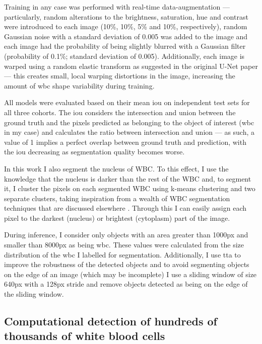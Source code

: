 Training in any case was performed with real-time data-augmentation --- particularly, random alterations to the brightness, saturation, hue and contrast were introduced to each image (10\%, 10\%, 5\% and 10\%, respectively), random Gaussian noise with a standard deviation of 0.005 was added to the image and each image had the probability of being slightly blurred with a Gaussian filter (probability of 0.1\%; standard deviation of 0.005). Additionally, each image is warped using a random elastic transform as suggested in the original U-Net paper \cite{Ronneberger2015-do} --- this creates small, local warping distortions in the image, increasing the amount of \ac{wbc} shape variability during training. 

All models were evaluated based on their mean \ac{iou} on independent test sets for all three cohorts. The \ac{iou} considers the intersection and union between the ground truth and the pixels predicted as belonging to the object of interest (\ac{wbc} in my case) and calculates the ratio between intersection and union --- as such, a value of 1 implies a perfect overlap between ground truth and prediction, with the \ac{iou} decreasing as segmentation quality becomes worse.

In this work I also segment the nucleus of WBC. To this effect, I use the knowledge that the nucleus is darker than the rest of the WBC and, to segment it, I cluster the pixels on each segmented WBC using k-means clustering and two separate clusters, taking inspiration from a wealth of WBC segmentation techniques that are discussed elsewhere \cite{Andrade2019-qv}. Through this I can easily assign each pixel to the darkest (nucleus) or brightest (cytoplasm) part of the image.

During inference, I consider only objects with an area greater than 1000px and smaller than 8000px as being \ac{wbc}. These values were calculated from the size distribution of the \ac{wbc} I labelled for segmentation. Additionally, I use \ac{tta} to improve the robustness of the detected objects and to avoid segmenting objects on the edge of an image (which may be incomplete) I use a sliding window of size 640px with a 128px stride and remove objects detected as being on the edge of the sliding window. 

\subsection{Computational detection of hundreds of thousands of white blood cells}

